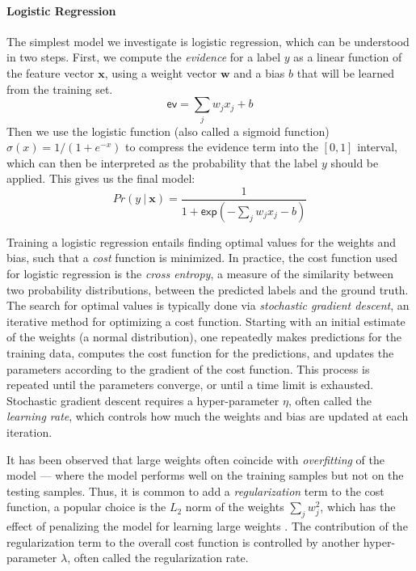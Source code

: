 \paragraph{Logistic Regression}


The simplest model we investigate is logistic regression, which can be
understood in two steps.
%
First, we compute the \emph{evidence} for a label $y$ as a linear
function of the feature vector $\mathbf{x}$, using a weight vector
$\mathbf{w}$ and a bias $b$ that will be learned from the training set.
$$
\mathsf{ev} = \sum_j w_j x_j + b
$$
Then we use the logistic function (also called a sigmoid function)
$\sigma(x) = 1 / (1 + e^{-x})$ to compress the evidence term into the
$[0,1]$ interval, which can then be interpreted as the probability that
the label $y$ should be applied.
%
This gives us the final model:
$$
Pr(y\ |\ \mathbf{x}) = \frac{1}{1 + \mathsf{exp}(-\sum_j w_j x_j - b)}
$$

Training a logistic regression entails finding optimal values for the
weights and bias, such that a \emph{cost} function is minimized.
%
In practice, the cost function used for logistic regression is the
\emph{cross entropy}, a measure of the similarity between two
probability distributions, between the predicted labels and the ground
truth.
%
The search for optimal values is typically done via \emph{stochastic
  gradient descent}, an iterative method for optimizing a cost function.
%
Starting with an initial estimate of the weights (\eg a normal
distribution), one repeatedly makes predictions for the training data,
computes the cost function for the predictions, and updates the
parameters according to the gradient of the cost function.
%
This process is repeated until the parameters converge, or until a time
limit is exhausted.
%
Stochastic gradient descent requires a hyper-parameter $\eta$, often
called the \emph{learning rate}, which controls how much the weights and
bias are updated at each iteration.

It has been observed that large weights often coincide with
\emph{overfitting} of the model --- where the model performs well on the
training samples but not on the testing samples.
%
Thus, it is common to add a \emph{regularization} term to the cost
function, a popular choice is the $L_2$ norm of the weights
$\sum_j w_j^2$, which has the effect of penalizing the model for
learning large weights \citep{Park2008-no}.
%
The contribution of the regularization term to the overall cost function
is controlled by another hyper-parameter $\lambda$, often called the
regularization rate.

